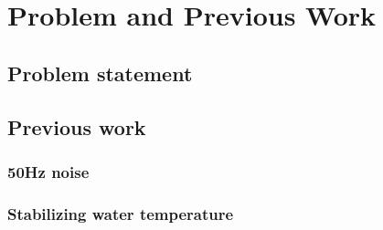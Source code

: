 \chapter{Problem and Previous Work}
\section{Problem statement}
\section{Previous work}
\subsection{50Hz noise}
\subsection{Stabilizing water temperature}